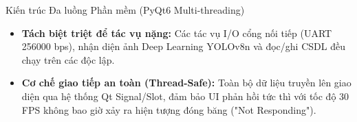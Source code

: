 \documentclass[aspectratio=169, 11pt]{beamer}
\newcommand{\code}[1]{\leavevmode{\ttfamily\color{DarkMain}#1}}
\begin{document}
\begin{frame}{Kiến trúc Đa luồng Phần mềm (PyQt6 Multi-threading)}
  \vspace{0.15cm}
  \raggedright
  \fontsize{7.6pt}{9.8pt}\selectfont
  \begin{itemize}
    \item \textbf{Tách biệt triệt để tác vụ nặng:} Các tác vụ I/O cổng nối tiếp (UART 256000 bps), nhận diện ảnh Deep Learning YOLOv8n và đọc/ghi CSDL đều chạy trên các \code{QThread} độc lập.
    \item \textbf{Cơ chế giao tiếp an toàn (Thread-Safe):} Toàn bộ dữ liệu truyền lên giao diện qua hệ thống Qt Signal/Slot, đảm bảo UI phản hồi tức thì với tốc độ 30 FPS không bao giờ xảy ra hiện tượng đóng băng ("Not Responding").
  \end{itemize}
\end{frame}

\end{document}
